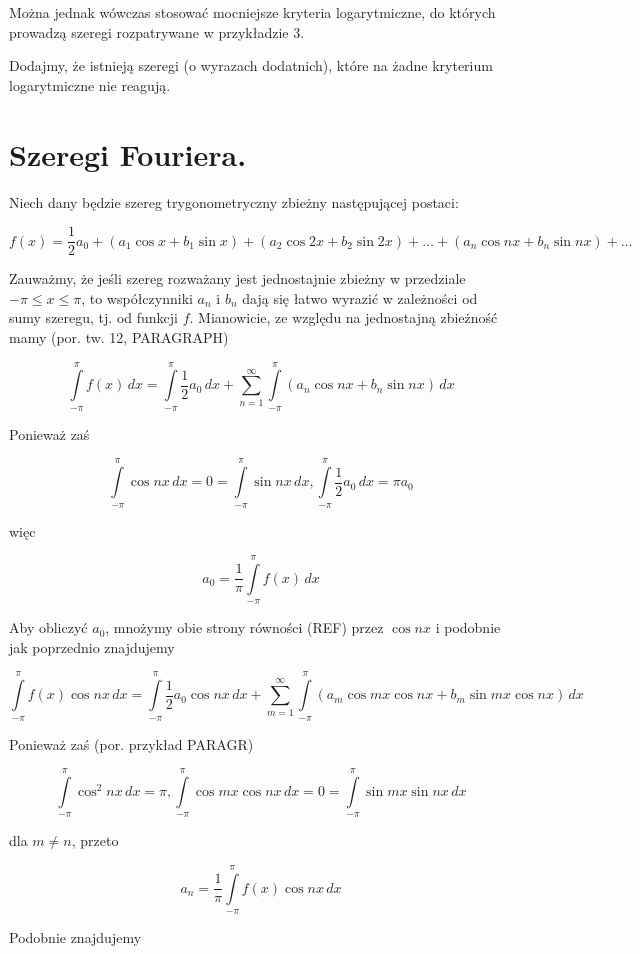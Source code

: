 \documentclass{book}
\begin{document}
Można jednak wówczas stosować mocniejsze kryteria logarytmiczne, do których prowadzą szeregi rozpatrywane w przykładzie 3.

Dodajmy, że istnieją szeregi (o wyrazach dodatnich), które na żadne kryterium logarytmiczne nie reagują.

\section{Szeregi Fouriera.}

Niech dany będzie szereg trygonometryczny zbieżny następującej postaci:

\[
f(x) = \frac{1}{2} a_{0} + (a_1 \cos x + b_1 \sin x) + (a_2 \cos 2x + b_2 \sin 2x) + \ldots + (a_n \cos nx + b_n \sin nx) + \ldots
\]

Zauważmy, że jeśli szereg rozważany jest jednostajnie zbieżny w przedziale $-\pi \leq x \leq \pi$, to współczynniki $a_n$ i $b_n$ dają się łatwo wyrazić w zależności od sumy szeregu, tj. od funkcji $f$. Mianowicie, ze względu na jednostajną zbieżność mamy (por. tw. 12, PARAGRAPH)

\[
\int\limits_{-\pi}^{\pi} f(x)\,dx = \int\limits_{-\pi}^{\pi} \frac{1}{2} a_0 \,dx + \sum_{n = 1}^{\infty} \int\limits_{-\pi}^{\pi} (a_n \cos nx + b_n \sin nx) \,dx
\]

Ponieważ zaś

\[
\int\limits_{-\pi}^{\pi} \cos nx \,dx = 0 = \int\limits_{-\pi}^{\pi} \sin nx \,dx, 
\int\limits_{-\pi}^{\pi} \frac{1}{2} a_0 \,dx = \pi a_0
\]

więc

\[
a_0 = \frac{1}{\pi} \int\limits_{-\pi}^{\pi} f(x) \,dx
\]

Aby obliczyć $a_0$, mnożymy obie strony równości (REF) przez $\cos nx$ i podobnie jak poprzednio znajdujemy

\[
\int\limits_{-\pi}^{\pi} f(x) \cos nx \,dx = \int\limits_{-\pi}^{\pi} \frac{1}{2} a_0 \cos nx \,dx + \sum_{m = 1}^{\infty} \int\limits_{-\pi}^{\pi} (a_m \cos mx \cos nx + b_m \sin mx \cos nx) \,dx
\]

Ponieważ zaś (por. przykład PARAGR)

\[
\int\limits_{-\pi}^{\pi} \cos^2 nx \,dx = \pi, 
\int\limits_{-\pi}^{\pi} \cos mx \cos nx \,dx = 0 = \int\limits_{-\pi}^{\pi} \sin mx \sin nx \,dx
\]

dla $m \neq n$, przeto

\[
a_n = \frac{1}{\pi} \int\limits_{-\pi}^{\pi} f(x) \cos nx \,dx
\]

Podobnie znajdujemy
\end{document}
